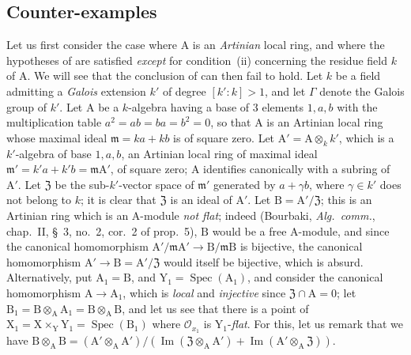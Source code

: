 \subsection{Counter-examples}
\label{subsection:IV.11.7}

\begin{env}[11.7.1]
\label{IV.11.7.1}
Let us first consider the case where $\mathrm{A}$ is an \emph{Artinian} local ring, and where the hypotheses of  are satisfied \emph{except} for condition~(ii) concerning the residue field $k$ of $\mathrm{A}$.
We will see that the conclusion of  can then fail to hold.
Let $k$ be a field admitting a \emph{Galois} extension $k'$ of degree $[k':k]>1$, and let $\Gamma$ denote the Galois group of $k'$.
Let $\mathrm{A}$ be a $k$-algebra having a base of $3$ elements $1,a,b$ with the multiplication table $a^2=ab=ba=b^2=0$, so that $\mathrm{A}$ is an Artinian local ring whose maximal ideal $\mathfrak{m}=ka+kb$ is of square zero.
Let $\mathrm{A}'=\mathrm{A}\otimes_k k'$, which is a $k'$-algebra of base $1,a,b$, an Artinian local ring of maximal ideal $\mathfrak{m}'=k'a+k'b=\mathfrak{m}\mathrm{A}'$, of square zero; $\mathrm{A}$ identifies canonically with a subring of $\mathrm{A}'$.
Let $\mathfrak{Z}$ be the sub-$k'$-vector space of $\mathfrak{m}'$ generated by $a+\gamma b$, where $\gamma\in k'$ does not belong to $k$; it is clear that $\mathfrak{Z}$ is an ideal of $\mathrm{A}'$.
Let $\mathrm{B}=\mathrm{A}'/\mathfrak{Z}$; this is an Artinian ring which is an $\mathrm{A}$-module \emph{not flat}; indeed (Bourbaki, \emph{Alg.\ comm.}, chap.~II, \S~3, no.~2, cor.~2 of prop.~5), $\mathrm{B}$ would be a free $\mathrm{A}$-module, and since the canonical homomorphism $\mathrm{A}'/\mathfrak{m}\mathrm{A}'\to\mathrm{B}/\mathfrak{m}\mathrm{B}$ is bijective, the canonical homomorphism $\mathrm{A}'\to\mathrm{B}=\mathrm{A}'/\mathfrak{Z}$ would itself
be bijective, which is absurd.
Alternatively, put $\mathrm{A}_1=\mathrm{B}$, and $\mathrm{Y}_1=\operatorname{Spec}(\mathrm{A}_1)$, and consider the canonical homomorphism $\mathrm{A}\to\mathrm{A}_1$, which is \emph{local} and \emph{injective} since $\mathfrak{Z}\cap\mathrm{A}=0$; let $\mathrm{B}_1=\mathrm{B}\otimes_\mathrm{A}\mathrm{A}_1=\mathrm{B}\otimes_\mathrm{A}\mathrm{B}$, and let us see that there is a point of $\mathrm{X}_1=\mathrm{X}\times_\mathrm{Y}\mathrm{Y}_1=\operatorname{Spec}(\mathrm{B}_1)$ where $\mathscr{O}_{x_1}$ is $\mathrm{Y}_1$-\emph{flat}.
For this, let us remark that we have $\mathrm{B}\otimes_\mathrm{A}\mathrm{B}=(\mathrm{A}'\otimes_\mathrm{A}\mathrm{A}')/(\operatorname{Im}(\mathfrak{Z}\otimes_\mathrm{A}\mathrm{A}')+\operatorname{Im}(\mathrm{A}'\otimes_\mathrm{A}\mathfrak{Z}))$.

\end{env}
